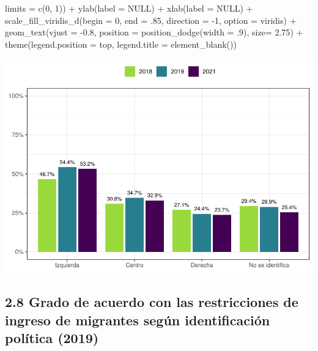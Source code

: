 \documentclass[
  12pt,
]{book}
\newenvironment{Shaded}{\begin{snugshade}}{\end{snugshade}}
\newcommand{\AttributeTok}[1]{\textcolor[rgb]{0.77,0.63,0.00}{#1}}
\newcommand{\ConstantTok}[1]{\textcolor[rgb]{0.00,0.00,0.00}{#1}}
\newcommand{\DecValTok}[1]{\textcolor[rgb]{0.00,0.00,0.81}{#1}}
\newcommand{\FloatTok}[1]{\textcolor[rgb]{0.00,0.00,0.81}{#1}}
\newcommand{\FunctionTok}[1]{\textcolor[rgb]{0.00,0.00,0.00}{#1}}
\newcommand{\NormalTok}[1]{#1}
\newcommand{\SpecialCharTok}[1]{\textcolor[rgb]{0.00,0.00,0.00}{#1}}
\newcommand{\StringTok}[1]{\textcolor[rgb]{0.31,0.60,0.02}{#1}}
\begin{document}
\begin{Shaded}
\begin{Highlighting}[]
                       \AttributeTok{limits =} \FunctionTok{c}\NormalTok{(}\DecValTok{0}\NormalTok{, }\DecValTok{1}\NormalTok{)) }\SpecialCharTok{+}
    \FunctionTok{ylab}\NormalTok{(}\AttributeTok{label =} \ConstantTok{NULL}\NormalTok{) }\SpecialCharTok{+}
    \FunctionTok{xlab}\NormalTok{(}\AttributeTok{label =} \ConstantTok{NULL}\NormalTok{) }\SpecialCharTok{+}
    \FunctionTok{scale\_fill\_viridis\_d}\NormalTok{(}\AttributeTok{begin =} \DecValTok{0}\NormalTok{, }\AttributeTok{end =}\NormalTok{ .}\DecValTok{85}\NormalTok{, }\AttributeTok{direction =} \SpecialCharTok{{-}}\DecValTok{1}\NormalTok{, }\AttributeTok{option =} \StringTok{\textquotesingle{}viridis\textquotesingle{}}\NormalTok{) }\SpecialCharTok{+}
    \FunctionTok{geom\_text}\NormalTok{(}\AttributeTok{vjust =} \SpecialCharTok{{-}}\FloatTok{0.8}\NormalTok{,}
              \AttributeTok{position =} \FunctionTok{position\_dodge}\NormalTok{(}\AttributeTok{width =}\NormalTok{ .}\DecValTok{9}\NormalTok{),}
              \AttributeTok{size=} \FloatTok{2.75}\NormalTok{) }\SpecialCharTok{+}
    \FunctionTok{theme}\NormalTok{(}\AttributeTok{legend.position =} \StringTok{\textquotesingle{}top\textquotesingle{}}\NormalTok{,}
          \AttributeTok{legend.title =} \FunctionTok{element\_blank}\NormalTok{())}
\end{Highlighting}
\end{Shaded}

\includegraphics{reporte-elsoc_files/figure-latex/unnamed-chunk-21-1.pdf}

\hypertarget{grado-de-acuerdo-con-las-restricciones-de-ingreso-de-migrantes-seguxfan-identificaciuxf3n-poluxedtica-2019}{%
\subsection{2.8 Grado de acuerdo con las restricciones de ingreso de migrantes según identificación política (2019)}\label{grado-de-acuerdo-con-las-restricciones-de-ingreso-de-migrantes-seguxfan-identificaciuxf3n-poluxedtica-2019}}
\end{document}

